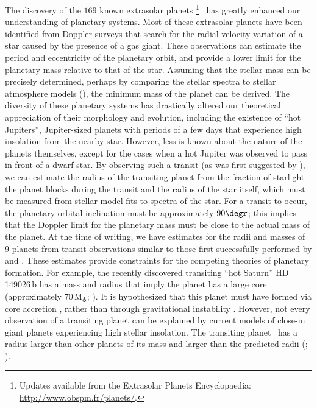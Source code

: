The discovery of the $169$ known extrasolar planets%
\footnote{Updates available from the
Extrasolar Planets Encyclopaedia:\\
\url{http://www.obspm.fr/planets/}.}%
\ has greatly enhanced our
understanding of planetary systems. Most of these extrasolar planets
have been identified from Doppler surveys that search for the radial
velocity variation of a star caused by the presence of a gas giant.
These observations can estimate the period and eccentricity of the
planetary orbit, and provide a lower limit for the planetary mass
relative to that of the star. Assuming that the stellar mass can be
precisely determined, perhaps by comparing the stellar spectra to
stellar atmosphere models (\citealp[such as][]{Kurucz:ATLAS9:1993a}),%
the minimum mass of the planet can be derived.  The diversity of these
planetary systems has drastically altered our theoretical appreciation
of their morphology and evolution, including the existence of ``hot
Jupiters'', Jupiter-sized planets with periods of a few days that
experience high insolation from the nearby star.  However, less is
known about the nature of the planets themselves, except for the cases
when a hot Jupiter was observed to pass in front of a dwarf star. By
observing such a transit (as was first suggested by
\citealt{Struve:obs:1952a}), we can estimate the radius of the
transiting planet from the fraction of starlight the planet blocks
during the transit and the radius of the star itself, which must be
measured from stellar model fits to spectra of the star. For a transit
to occur, the planetary orbital inclination must be approximately
$90\degr$; this implies that the Doppler limit for the planetary
mass must be close to the actual mass of the planet. At the
time of writing, we have estimates for the radii and masses of 9 planets from transit
observations similar to those first successfully performed by
\citet{Charbonneau_Brown_Latham:apjl:2000a} and
\citet{Henry_Marcy_Butler:apj:2000a}. These estimates provide
constraints for the competing theories of planetary formation. For
example, the recently discovered transiting ``hot Saturn''
\mbox{HD\,149026\,b} has a mass and radius that imply the
planet has a large core (approximately $70\,\mathrm{M}_{\earth}$;
\citealt{Sato_Fischer_Henry:apj:2005a, Charbonneau_Winn_Latham:apj:2006a}).
It is hypothesized that this planet must have formed via core
accretion \citep{Pollack:araa:1984a, Pollack_Hubickyj_Bodenheimer:icarus:1996a},
rather than through gravitational instability \citep{Boss:sc:1997a}.
However, not every observation of a transiting planet can be explained
by current models of close-in giant planets experiencing high stellar
insolation. The transiting planet \hdTZNb\ has a radius larger than
other planets of its mass and larger than the predicted radii
(\citealp[see][ and references
therein]{Laughlin_Wolf_Vanmunster:apj:2005a};%
\citealt{Deming_Seager_Richardson:nat:2005a}).%

